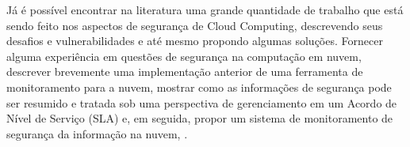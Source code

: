Já é possível encontrar na literatura uma grande quantidade de trabalho que está
sendo feito nos aspectos de segurança de Cloud Computing, descrevendo seus
desafios e vulnerabilidades e até mesmo propondo algumas soluções. Fornecer
alguma experiência em questões de segurança na computação em nuvem, descrever
brevemente uma implementação anterior de uma ferramenta de monitoramento para a
nuvem, mostrar como as informações de segurança pode ser resumido e tratada sob
uma perspectiva de gerenciamento em um \textsf{Acordo de Nível de Serviço (SLA)}
e, em seguida, propor um sistema de monitoramento de segurança da informação na
nuvem, .




